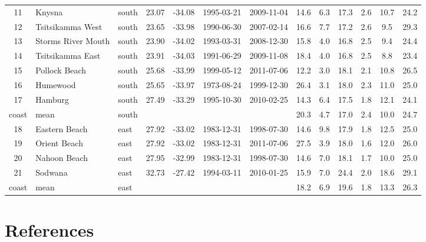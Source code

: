 \documentclass[a4paper,10pt,review]{elsarticle}
\begin{document}
\begin{table}[]
\begin{tabular}{cllcccccccccc}
11 & Knysna & south & 23.07 & -34.08 & 1995-03-21 & 2009-11-04 & 14.6 & 6.3 & 17.3 & 2.6 & 10.7 & 24.2 \\
12 & Tsitsikamma West & south & 23.65 & -33.98 & 1990-06-30 & 2007-02-14 & 16.6 & 7.7 & 17.2 & 2.6 & 9.5 & 29.3 \\
13 & Storms River Mouth & south & 23.90 & -34.02 & 1993-03-31 & 2008-12-30 & 15.8 & 4.0 & 16.8 & 2.5 & 9.4 & 24.4 \\
14 & Tsitsikamma East & south & 23.91 & -34.03 & 1991-06-29 & 2009-11-08 & 18.4 & 4.0 & 16.8 & 2.5 & 8.8 & 23.4 \\
15 & Pollock Beach & south & 25.68 & -33.99 & 1999-05-12 & 2011-07-06 & 12.2 & 3.0 & 18.1 & 2.1 & 10.8 & 26.5 \\
16 & Humewood & south & 25.65 & -33.97 & 1973-08-24 & 1999-12-30 & 26.4 & 3.1 & 18.0 & 2.3 & 11.0 & 25.0 \\
17 & Hamburg & south & 27.49 & -33.29 & 1995-10-30 & 2010-02-25 & 14.3 & 6.4 & 17.5 & 1.8 & 12.1 & 24.1 \\
coast & mean & south &  &  &  &  & 20.3 & 4.7 & 17.0 & 2.4 & 10.0 & 24.7 \\
18 & Eastern Beach & east & 27.92 & -33.02 & 1983-12-31 & 1998-07-30 & 14.6 & 9.8 & 17.9 & 1.8 & 12.5 & 25.0 \\
19 & Orient Beach & east & 27.92 & -33.02 & 1983-12-31 & 2011-07-06 & 27.5 & 3.9 & 18.0 & 1.6 & 12.0 & 26.0 \\
20 & Nahoon Beach & east & 27.95 & -32.99 & 1983-12-31 & 1998-07-30 & 14.6 & 7.0 & 18.1 & 1.7 & 10.0 & 25.0 \\
21 & Sodwana & east & 32.73 & -27.42 & 1994-03-11 & 2010-01-25 & 15.9 & 7.0 & 24.4 & 2.0 & 18.6 & 29.1 \\
coast & mean & east &  &  &  &  & 18.2 & 6.9 & 19.6 & 1.8 & 13.3 & 26.3 \\
   \hline
\end{tabular}
\end{table}

\section*{References}


\end{document}
